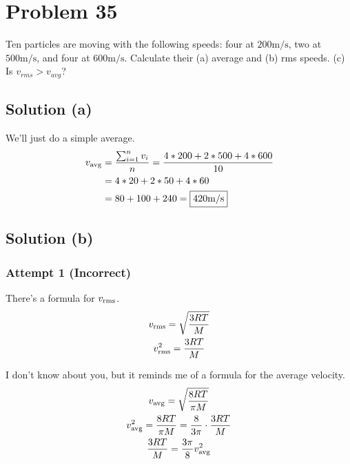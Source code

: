 \documentclass[12pt]{article}
\begin{document}
    \pagebreak
    \section{Problem 35}
        Ten particles are moving with the following speeds: four at $200 \unit{\meter/\second}$, two at $500 \unit{\meter/\second}$, and four at $600 \unit{\meter/\second}$. 
        Calculate their (a) average and (b) rms speeds. 
        (c) Is $v_{rms} > v_{avg}$?

        \subsection{Solution (a)}
            We'll just do a simple average.
            \begin{align}
                v_{\rm avg} &=  \frac{\sum_{i = 1}^n v_i}{n}
                    =   \frac{4 * 200 + 2 * 500 + 4 * 600}{10}\\
                    &=  4 * 20 + 2 * 50 + 4 * 60\\
                    &=  80 + 100 + 240
                    =   \boxed{420\unit{\meter/\second}}
            \end{align}

        \subsection{Solution (b)}
            \subsubsection{Attempt 1 (Incorrect)}
                There's a formula for $v_{\rm rms}$.
                \begin{gather}
                    v_{\rm rms} =   \sqrt{\frac{3RT}{M}}\\
                    v_{\rm rms}^2   =  \frac{3RT}{M}
                \end{gather}

                I don't know about you, but it reminds me of a formula for the average velocity.
                \begin{gather}
                    v_{\rm avg} =   \sqrt{\frac{8RT}{\pi M}}\\
                    v_{\rm avg}^2   =   \frac{8RT}{\pi M}
                        =   \frac{8}{3 \pi} \cdot \frac{3RT}{M}\\
                    \frac{3RT}{M}   =   \frac{3 \pi}{8} v_{\rm avg}^2
                \end{gather}
\end{document}
